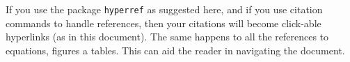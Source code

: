 \documentclass{scspaperproc}
\theoremstyle{scsthe}
\begin{document}
If you use the package \texttt{hyperref} as suggested here, and if you use citation commands to handle references, then your citations will
become click-able hyperlinks (as in this document). The same happens to all the references to equations, figures a tables. This can aid the reader in navigating the document.


%
%
%
%
%
\end{document}

